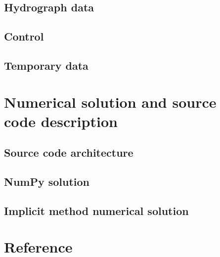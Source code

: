     \subsection{Hydrograph data}
    \subsection{Control}
    \subsection{Temporary data}

\FloatBarrier
\section{Numerical solution and source code description}

    \subsection{Source code architecture}
    \subsection{NumPy solution}
    \subsection{Implicit method numerical solution}

\FloatBarrier
\section{Reference}




%
%

%
